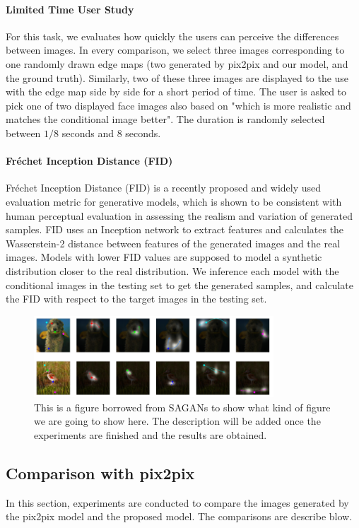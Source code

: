 \paragraph{Limited Time User Study}
For this task, we evaluates how quickly the users can perceive the differences between images. In every comparison, we  select three images corresponding to one randomly drawn edge maps (two generated by pix2pix and our model, and the ground truth). Similarly, two of these three images are displayed to the use with the edge map side by side for a short period of time. The user is asked to pick one of two displayed face images also based on "which is more realistic and matches the conditional image better". The duration is randomly selected between $1/8$ seconds and $8$ seconds. 
\paragraph{Fr\'echet Inception Distance (FID)}
Fr\'echet Inception Distance (FID) \cite{FID} is a recently proposed and widely used evaluation metric for generative models, which is shown to be consistent with human perceptual evaluation in assessing the realism and variation of generated samples. FID uses an Inception network to extract features and calculates the Wasserstein-2 distance between features of the generated images and the real images. Models with lower FID values are supposed to model a synthetic distribution closer to the real distribution. We inference each model with the conditional images in the testing set to get the generated samples, and calculate the FID with respect to the target images in the testing set.
%
%
\begin{figure}
	\includegraphics[width=0.8\textwidth]{figures/attention}
	\caption{This is a figure borrowed from SAGANs to show what kind of figure we are going to show here. The description will be added once the experiments are finished and the results are obtained.}
	\label{fig:attention}
\end{figure}
%
%
\subsection{Comparison with pix2pix}
%
In this section, experiments are conducted to compare the images generated by the pix2pix model and the proposed model. The comparisons are describe blow.
